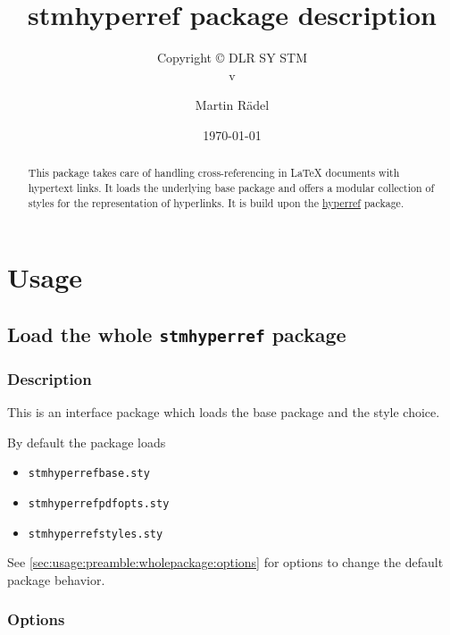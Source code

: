 \documentclass[%
  type=article,%
  layout=koma,%
  conditionallox=true,%
  conditionalloxnewpage=false,%
  date=true,%
  index=true,%
  listings=true%
]{stmtext}
\author{Martin R\"{a}del}
\title{stmhyperref package description}
\subtitle{Copyright \copyright{} \the\year{} DLR SY STM\\v\formatdate[versiondatestyle]{\DTMToday}}
\date{\today}
\begin{document}
\maketitle

\begin{abstract}
This package takes care of handling cross-referencing in \LaTeX{} documents with hypertext links. It loads the underlying base package and offers a modular collection of styles for the representation of hyperlinks. It is build upon the \href{https://ctan.org/pkg/hyperref}{hyperref} package.
\end{abstract}

\tableofcontents

\conditionallistoffigures  %
\conditionallistoftables   %
\conditionallistoflistings %

\section{Usage}%

\subsection{Load the whole \protect\texttt{stmhyperref} package}
\label{sec:usage:preamble:wholepackage}

\subsubsection{Description}
\label{sec:usage:preamble:wholepackage:description}

This is an interface package which loads the base package and the style choice.

By default the package loads

\begin{itemize}[noitemsep]
  \item \verb+stmhyperrefbase.sty+
  \item \verb+stmhyperrefpdfopts.sty+
  \item \verb+stmhyperrefstyles.sty+
\end{itemize}

See \autoref{sec:usage:preamble:wholepackage:options} for options to change the default package behavior.

\subsubsection{Options}
\label{sec:usage:preamble:wholepackage:options}
\end{document}
